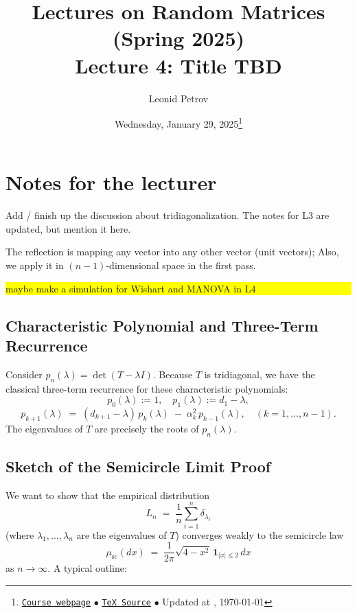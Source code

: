 \documentclass[letterpaper,11pt,oneside,reqno]{article}
\numberwithin{equation}{section}
\theoremstyle{definition}
\newenvironment{lnotes}{\section*{Notes for the lecturer}}{}
\begin{document}
\title{Lectures on Random Matrices
(Spring 2025)
\\Lecture 4: Title TBD}


\date{Wednesday, January 29, 2025\footnote{\href{https://lpetrov.cc/rmt25/}{\texttt{Course webpage}}
$\bullet$ \href{https://lpetrov.cc/rmt25/rmt25-notes/rmt2025-l04.tex}{\texttt{TeX Source}}
$\bullet$
Updated at \currenttime, \today}}



\author{Leonid Petrov}


\maketitle


\begin{lnotes}

	Add / finish up the discussion about tridiagonalization. The notes for L3 are updated, but
	mention it here.

	The reflection is mapping any vector into any other vector (unit vectors);
	Also, we apply it in $(n-1)$-dimensional space in the first pass.


\colorbox{yellow}{\parbox{.7\textwidth}{maybe make a simulation for Wishart and MANOVA in L4}}


\subsection{Characteristic Polynomial and Three-Term Recurrence}

Consider \(p_n(\lambda) = \det(T - \lambda I)\).  Because \(T\) is tridiagonal, we have the classical three-term recurrence for these characteristic polynomials:
\[
  p_0(\lambda) := 1,\quad
  p_1(\lambda) := d_1 - \lambda,
\]
\[
  p_{k+1}(\lambda)
  \;=\;
  (d_{k+1} - \lambda)\,p_k(\lambda)
  \;-\;\alpha_k^2\,p_{k-1}(\lambda),
  \quad
  (k=1,\dots,n-1).
\]
The eigenvalues of \(T\) are precisely the roots of \(p_n(\lambda)\).

\subsection{Sketch of the Semicircle Limit Proof}

We want to show that the empirical distribution
\[
  L_n
  \;=\;
  \frac{1}{n}\sum_{i=1}^n \delta_{\lambda_i}
\]
(where \(\lambda_1,\dots,\lambda_n\) are the eigenvalues of \(T\)) converges weakly to the semicircle law
\[
  \mu_{\mathrm{sc}}(dx)
  \;=\;
  \frac{1}{2\pi}\sqrt{4 - x^2}\,\mathbf{1}_{|x|\le 2}\,dx
\]
as \(n\to\infty\).  A typical outline:


\end{lnotes}
\end{document}
